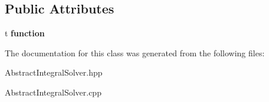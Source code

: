 \subsection*{Public Attributes}
\begin{DoxyCompactItemize}
\item 
\mbox{\label{class_abstract_integral_solver_ae31c391a21c6057e313295ad04de8a69}} 
t {\bfseries function}
\end{DoxyCompactItemize}


The documentation for this class was generated from the following files\+:\begin{DoxyCompactItemize}
\item 
Abstract\+Integral\+Solver.\+hpp\item 
Abstract\+Integral\+Solver.\+cpp\end{DoxyCompactItemize}
